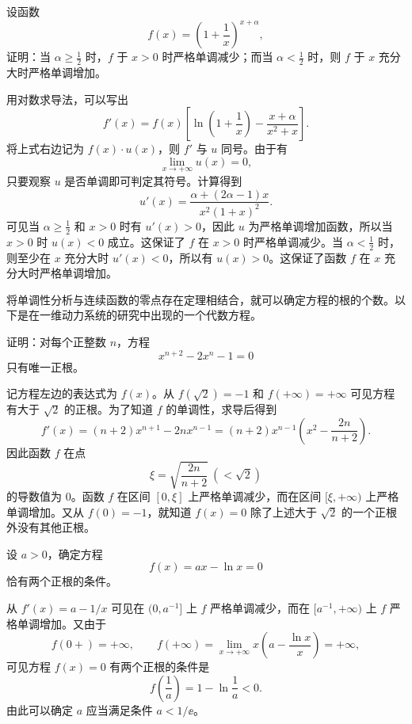 \begin{xexample}[8.2.3]
设函数
\[
  f(x)=\left(1+\frac1x\right)^{x+\alpha},
\]
证明：当 $\alpha\ge\frac12$ 时，$f$ 于 $x>0$ 时严格单调减少；而当 $\alpha<\frac12$ 时，则 $f$ 于 $x$ 充分大时严格单调增加。
\end{xexample}
\begin{xproof}
用对数求导法，可以写出
\[
  f'(x)=f(x)\left[\ln\left(1+\frac1x\right)-\frac{x+\alpha}{x^2+x}\right].
\]
将上式右边记为 $f(x)\cdot u(x)$，则 $f'$ 与 $u$ 同号。由于有
\[
  \lim_{x\to+\infty}u(x)=0,
\]
只要观察 $u$ 是否单调即可判定其符号。计算得到
\[
  u'(x)=\frac{\alpha+(2\alpha-1)x}{x^2(1+x)^2}.
\]
可见当 $\alpha\ge\frac12$ 和 $x>0$ 时有 $u'(x)>0$，因此 $u$ 为严格单调增加函数，所以当 $x>0$ 时 $u(x)<0$ 成立。这保证了 $f$ 在 $x>0$ 时严格单调减少。当 $\alpha<\frac12$ 时，则至少在 $x$ 充分大时 $u'(x)<0$，所以有 $u(x)>0$。这保证了函数 $f$ 在 $x$ 充分大时严格单调增加。
\end{xproof}

将单调性分析与连续函数的零点存在定理相结合，就可以确定方程的根的个数。以下是在一维动力系统的研究中出现的一个代数方程。

\begin{xexample}[8.2.4]
证明：对每个正整数 $n$，方程
\[
  x^{n+2}-2x^n-1=0
\]
只有唯一正根。
\end{xexample}
\begin{xproof}
记方程左边的表达式为 $f(x)$。从 $f(\sqrt2)=-1$ 和 $f(+\infty)=+\infty$ 可见方程有大于 $\sqrt2$ 的正根。为了知道 $f$ 的单调性，求导后得到
\[
  f'(x)=(n+2)x^{n+1}-2nx^{n-1}
  =(n+2)x^{n-1}\left(x^2-\frac{2n}{n+2}\right).
\]
因此函数 $f$ 在点
\[
  \xi=\sqrt{\frac{2n}{n+2}}\ (<\sqrt2)
\]
的导数值为 0。函数 $f$ 在区间 $[0,\xi]$ 上严格单调减少，而在区间 $[\xi,+\infty)$ 上严格单调增加。又从 $f(0)=-1$，就知道 $f(x)=0$ 除了上述大于 $\sqrt2$ 的一个正根外没有其他正根。
\end{xproof}

\begin{xexample}[8.2.5]
设 $a>0$，确定方程
\[
  f(x)=ax-\ln x=0
\]
恰有两个正根的条件。
\end{xexample}
\begin{xsolution}
从 $f'(x)=a-1/x$ 可见在 $(0,a^{-1}]$ 上 $f$ 严格单调减少，而在 $[a^{-1},+\infty)$ 上 $f$ 严格单调增加。又由于
\[
  f(0+)=+\infty,\qquad
  f(+\infty)=\lim_{x\to+\infty}x\left(a-\frac{\ln x}{x}\right)=+\infty,
\]
可见方程 $f(x)=0$ 有两个正根的条件是
\[
  f\left(\frac1a\right)=1-\ln\frac1a<0.
\]
由此可以确定 $a$ 应当满足条件 $a<1/\ee$。
\end{xsolution}

